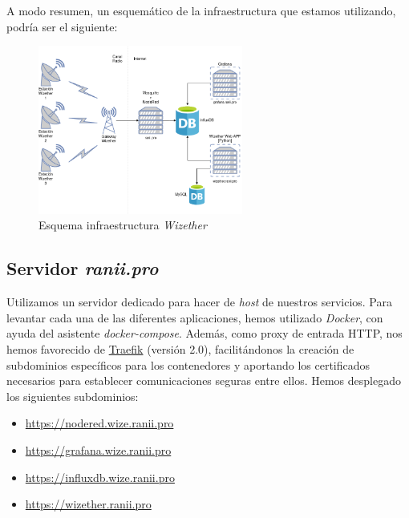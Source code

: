 \documentclass[12pt]{article}
\begin{document}
\noindent A modo resumen, un esquemático de la infraestructura que estamos utilizando, podría ser el siguiente:

\begin{figure}[h]
	\begin{center}
		\includegraphics[width=0.6\textwidth]{img_rani/WizeTher_infraestructura.png}
		\caption{Esquema infraestructura \textit{Wizether}}
	\end{center}
\end{figure}

\pagebreak

\subsection{Servidor \textit{ranii.pro}}
\noindent Utilizamos un servidor dedicado para hacer de \textit{host} de nuestros servicios. Para levantar cada una de las diferentes aplicaciones, hemos utilizado \textit{Docker}, con ayuda del asistente \textit{docker-compose}. Además, como proxy de entrada HTTP, nos hemos favorecido de \href{https://traefik.io/}{Traefik} (versión 2.0), facilitándonos la creación de subdominios específicos para los contenedores y aportando los certificados necesarios para establecer comunicaciones seguras entre ellos. Hemos desplegado los siguientes subdominios:
\begin{itemize}
	\item \href{https://nodered.wize.ranii.pro}{https://nodered.wize.ranii.pro} 
	
	\item \href{https://grafana.wize.ranii.pro}{https://grafana.wize.ranii.pro} 
	
	\item \href{https://influxdb.wize.ranii.pro}{https://influxdb.wize.ranii.pro} 
	
	\item \href{https://wizether.ranii.pro}{https://wizether.ranii.pro} 
	
\end{itemize}
\end{document}
